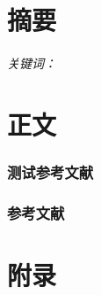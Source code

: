\documentclass[a4paper,11pt]{ctexart}
\begin{document}
\part*{摘要}
\paragraph{关键词：}

\tableofcontents            %
\newpage

\part{正文}
\section{测试参考文献}
\cite{BiBTest}


\section{参考文献}

\newpage
\appendix
\part{附录}
\end{document}
